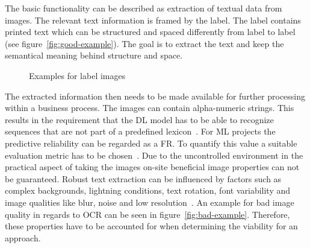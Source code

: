 The basic functionality can be described as extraction of textual data from images.
The relevant text information is framed by the label.
The label contains printed text which can be structured and spaced differently from label to
label (see figure~\ref{fig:good-example}).
The goal is to extract the text and keep the semantical meaning behind structure and space.
\begin{figure}
    \centering
    \caption{Examples for label images\label{fig:examples}}
\end{figure}
The extracted information then needs to be made available for further processing within a
business process.
The images can contain alpha-numeric strings.
This results in the requirement that the \ac{DL} model has to be able to recognize sequences that
are not part of a predefined lexicon~\cite{ghosh_visual_2017}.
For \ac{ML} projects the predictive reliability can be regarded as a \ac{FR}.
To quantify this value a suitable evaluation metric has to be
chosen~\cite{vogelsang_requirements_2019}.
Due to the uncontrolled environment in the practical aspect of taking the images on-site beneficial
image properties can not be guaranteed.
Robust text extraction can be influenced by factors such as complex backgrounds, lightning conditions,
text rotation, font variability and image qualities like blur, noise and low
resolution~\cite{oyedotun_deep_2015,ghosh_visual_2017}.
An example for bad image quality in regards to \ac{OCR} can be seen in figure~\ref{fig:bad-example}.
Therefore, these properties have to be accounted for when determining the viability for an approach.


